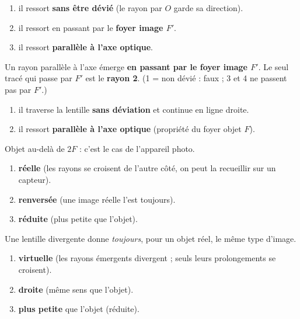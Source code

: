 \documentclass[11pt,a4paper]{article}
\begin{document}

\begin{corrige}
\begin{enumerate}[label=\alph*)]
  \item il ressort \textbf{sans être dévié} (le rayon par $O$ garde sa direction).
  \item il ressort en passant par le \textbf{foyer image $F'$}.
  \item il ressort \textbf{parallèle à l'axe optique}.
\end{enumerate}
\end{corrige}

\begin{corrige}
Un rayon parallèle à l'axe émerge \textbf{en passant par le foyer image $F'$}. Le seul tracé qui passe
par $F'$ est le \textbf{rayon 2}. (1 = non dévié : faux ; 3 et 4 ne passent pas par $F'$.)
\end{corrige}

\begin{corrige}
\begin{enumerate}[label=\alph*)]
  \item il traverse la lentille \textbf{sans déviation} et continue en ligne droite.
  \item il ressort \textbf{parallèle à l'axe optique} (propriété du foyer objet $F$).
\end{enumerate}
\end{corrige}

\begin{corrige}
Objet au-delà de $2F$ : c'est le cas de l'appareil photo.
\begin{enumerate}[label=\alph*)]
  \item \textbf{réelle} (les rayons se croisent de l'autre côté, on peut la recueillir sur un capteur).
  \item \textbf{renversée} (une image réelle l'est toujours).
  \item \textbf{réduite} (plus petite que l'objet).
\end{enumerate}
\end{corrige}

\begin{corrige}
Une lentille divergente donne \emph{toujours}, pour un objet réel, le même type d'image.
\begin{enumerate}[label=\alph*)]
  \item \textbf{virtuelle} (les rayons émergents divergent ; seuls leurs prolongements se croisent).
  \item \textbf{droite} (même sens que l'objet).
  \item \textbf{plus petite} que l'objet (réduite).
\end{enumerate}
\end{corrige}
\end{document}
